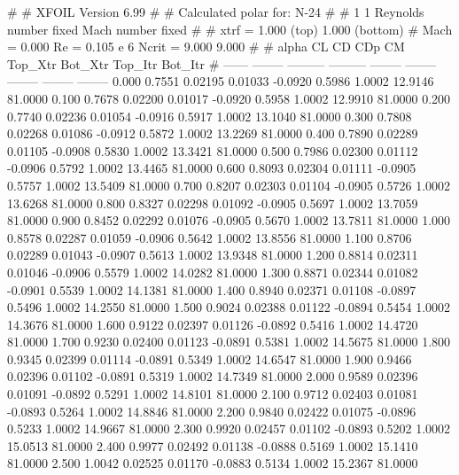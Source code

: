 #  
#       XFOIL         Version 6.99
#  
# Calculated polar for: N-24                                            
#  
# 1 1 Reynolds number fixed          Mach number fixed         
#  
# xtrf =   1.000 (top)        1.000 (bottom)  
# Mach =   0.000     Re =     0.105 e 6     Ncrit =   9.000  9.000
#  
#   alpha    CL        CD       CDp       CM     Top_Xtr  Bot_Xtr  Top_Itr  Bot_Itr
#  ------ -------- --------- --------- -------- -------- -------- -------- --------
   0.000   0.7551   0.02195   0.01033  -0.0920   0.5986   1.0002  12.9146  81.0000
   0.100   0.7678   0.02200   0.01017  -0.0920   0.5958   1.0002  12.9910  81.0000
   0.200   0.7740   0.02236   0.01054  -0.0916   0.5917   1.0002  13.1040  81.0000
   0.300   0.7808   0.02268   0.01086  -0.0912   0.5872   1.0002  13.2269  81.0000
   0.400   0.7890   0.02289   0.01105  -0.0908   0.5830   1.0002  13.3421  81.0000
   0.500   0.7986   0.02300   0.01112  -0.0906   0.5792   1.0002  13.4465  81.0000
   0.600   0.8093   0.02304   0.01111  -0.0905   0.5757   1.0002  13.5409  81.0000
   0.700   0.8207   0.02303   0.01104  -0.0905   0.5726   1.0002  13.6268  81.0000
   0.800   0.8327   0.02298   0.01092  -0.0905   0.5697   1.0002  13.7059  81.0000
   0.900   0.8452   0.02292   0.01076  -0.0905   0.5670   1.0002  13.7811  81.0000
   1.000   0.8578   0.02287   0.01059  -0.0906   0.5642   1.0002  13.8556  81.0000
   1.100   0.8706   0.02289   0.01043  -0.0907   0.5613   1.0002  13.9348  81.0000
   1.200   0.8814   0.02311   0.01046  -0.0906   0.5579   1.0002  14.0282  81.0000
   1.300   0.8871   0.02344   0.01082  -0.0901   0.5539   1.0002  14.1381  81.0000
   1.400   0.8940   0.02371   0.01108  -0.0897   0.5496   1.0002  14.2550  81.0000
   1.500   0.9024   0.02388   0.01122  -0.0894   0.5454   1.0002  14.3676  81.0000
   1.600   0.9122   0.02397   0.01126  -0.0892   0.5416   1.0002  14.4720  81.0000
   1.700   0.9230   0.02400   0.01123  -0.0891   0.5381   1.0002  14.5675  81.0000
   1.800   0.9345   0.02399   0.01114  -0.0891   0.5349   1.0002  14.6547  81.0000
   1.900   0.9466   0.02396   0.01102  -0.0891   0.5319   1.0002  14.7349  81.0000
   2.000   0.9589   0.02396   0.01091  -0.0892   0.5291   1.0002  14.8101  81.0000
   2.100   0.9712   0.02403   0.01081  -0.0893   0.5264   1.0002  14.8846  81.0000
   2.200   0.9840   0.02422   0.01075  -0.0896   0.5233   1.0002  14.9667  81.0000
   2.300   0.9920   0.02457   0.01102  -0.0893   0.5202   1.0002  15.0513  81.0000
   2.400   0.9977   0.02492   0.01138  -0.0888   0.5169   1.0002  15.1410  81.0000
   2.500   1.0042   0.02525   0.01170  -0.0883   0.5134   1.0002  15.2367  81.0000
